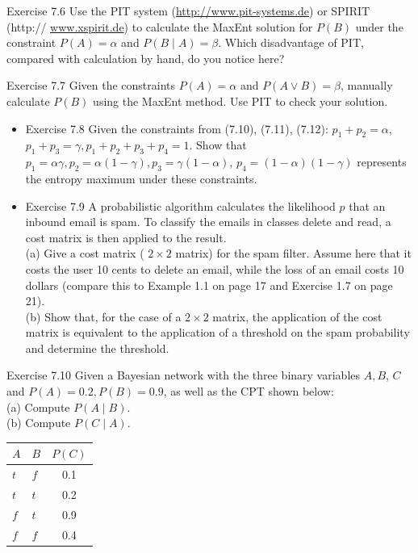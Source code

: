 \documentclass[10pt]{book}
\begin{document}
Exercise 7.6 Use the PIT system (\href{http://www.pit-systems.de}{http://www.pit-systems.de}) or SPIRIT (http:// \href{http://www.xspirit.de}{www.xspirit.de}) to calculate the MaxEnt solution for $P(B)$ under the constraint $P(A)=\alpha$ and $P(B \mid A)=\beta$. Which disadvantage of PIT, compared with calculation by hand, do you notice here?

Exercise 7.7 Given the constraints $P(A)=\alpha$ and $P(A \vee B)=\beta$, manually calculate $P(B)$ using the MaxEnt method. Use PIT to check your solution.

\begin{itemize}
  \item Exercise 7.8 Given the constraints from (7.10), (7.11), (7.12): $p_{1}+p_{2}=\alpha$, $p_{1}+p_{3}=\gamma, p_{1}+p_{2}+p_{3}+p_{4}=1$. Show that $p_{1}=\alpha \gamma, p_{2}=\alpha(1-\gamma), p_{3}=\gamma(1-\alpha)$, $p_{4}=(1-\alpha)(1-\gamma)$ represents the entropy maximum under these constraints.
  \item Exercise 7.9 A probabilistic algorithm calculates the likelihood $p$ that an inbound email is spam. To classify the emails in classes delete and read, a cost matrix is then applied to the result.\\

(a) Give a cost matrix ( $2 \times 2$ matrix) for the spam filter. Assume here that it costs the user 10 cents to delete an email, while the loss of an email costs 10 dollars (compare this to Example 1.1 on page 17 and Exercise 1.7 on page 21).\\
(b) Show that, for the case of a $2 \times 2$ matrix, the application of the cost matrix is equivalent to the application of a threshold on the spam probability and determine the threshold.
\end{itemize}

Exercise 7.10 Given a Bayesian network with the three binary variables $A, B$, $C$ and $P(A)=0.2, P(B)=0.9$, as well as the CPT shown below:\\
(a) Compute $P(A \mid B)$.\\
(b) Compute $P(C \mid A)$.

\begin{center}
\begin{tabular}{llc}
\hline
$A$ & $B$ & $P(C)$ \\
\hline
$t$ & $f$ & 0.1 \\
\hline
$t$ & $t$ & 0.2 \\
\hline
$f$ & $t$ & 0.9 \\
\hline
$f$ & $f$ & 0.4 \\
\hline
\end{tabular}
\end{center}
\end{document}
